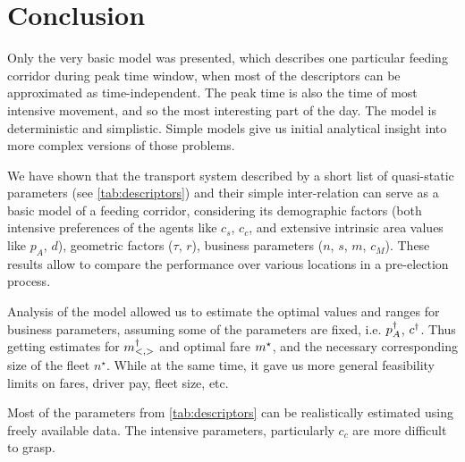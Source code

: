 \documentclass[a4paper]{report}
\begin{document}
\section{Conclusion}
Only the very basic model was presented, which describes one particular feeding corridor during peak time window, when most of the descriptors can be approximated as time-independent. The peak time is also the time of most intensive movement, and so the most interesting part of the day. The model is deterministic and simplistic. Simple models give us initial analytical insight into more complex versions of those problems.

We have shown that the transport system described by a short list of quasi-static parameters (see \autoref{tab:descriptors}) and their simple inter-relation  can serve as a basic model of a feeding corridor, considering its demographic factors (both intensive preferences of the agents like $c_s$, $c_c$, and extensive intrinsic area values like $p_A$, $d$), geometric factors ($\tau$, $r$), business parameters ($n$, $s$, $m$, $c_M$). These results allow to compare the performance over various locations in a pre-election process.

Analysis of the model allowed us to estimate the optimal values and ranges for business parameters, assuming some of the parameters are fixed, i.e. $p_A^{\dagger}$, $c^{\dagger}$. Thus getting estimates for $m^{\dagger}_{<,>}$ and optimal fare $m^{\star}$, and the necessary corresponding size of the fleet $n^{\star}$. While at the same time, it gave us more general feasibility limits on fares, driver pay, fleet size, etc.

Most of the parameters from \autoref{tab:descriptors} can be realistically estimated using freely available data. The intensive parameters, particularly $c_c$ are more difficult to grasp.
\end{document}

